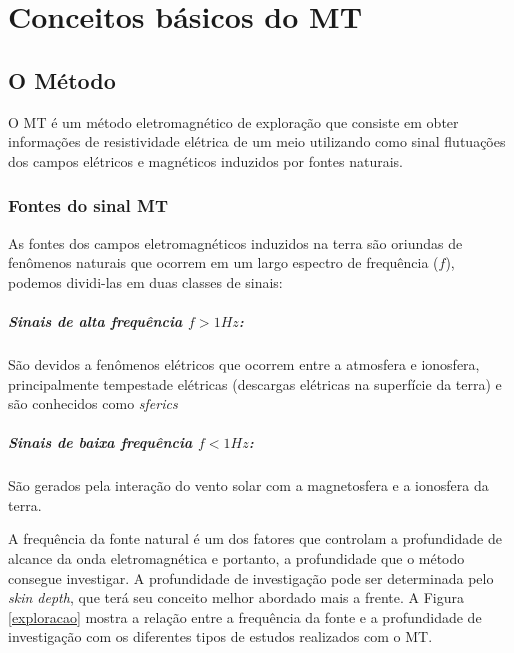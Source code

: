 \chapter{Conceitos básicos do MT}
\label{CapMT}
\section{O Método}

O MT é um método eletromagnético de exploração  que consiste em obter informações de resistividade elétrica de um meio utilizando como sinal flutuações dos campos elétricos e magnéticos induzidos por fontes naturais.

\subsection{Fontes do sinal MT}

As fontes dos campos eletromagnéticos induzidos na terra são oriundas de fenômenos naturais que ocorrem em um largo espectro de frequência ($f$), podemos dividi-las em duas classes de sinais:
\paragraph{Sinais de alta frequência $f>1 Hz$:}

São devidos a fenômenos elétricos que ocorrem entre a atmosfera e ionosfera, principalmente tempestade elétricas (descargas elétricas na superfície da terra) e são conhecidos como \textit{sferics}

\paragraph{Sinais de baixa frequência $f<1 Hz$:}

 São gerados pela interação do vento solar com a magnetosfera e a ionosfera da terra.
  
 A frequência da fonte natural é um dos fatores que controlam a profundidade de alcance da onda eletromagnética e portanto, a profundidade que o método consegue investigar. A profundidade de investigação pode ser determinada pelo \textit{skin depth}, que terá seu conceito melhor abordado mais a frente. A Figura \ref{exploracao} mostra a relação entre a frequência da fonte e a profundidade de investigação com os diferentes tipos de estudos realizados com o MT.  
 
 
 



